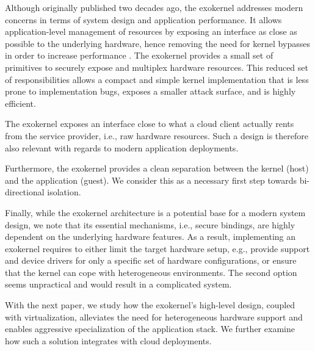 Although originally published two decades ago, the exokernel addresses modern concerns in terms of system design and application performance.
It allows application-level management of resources by exposing an interface as close as possible to the underlying hardware, hence removing the need for kernel bypasses in order to increase performance \cite{BelayPKGKB14,DBLP:journals/tocs/CaoFKL96}.
The exokernel provides a small set of primitives to securely expose and multiplex hardware resources.
This reduced set of responsibilities allows a compact and simple kernel implementation that is less prone to implementation bugs, exposes a smaller attack surface, and is highly efficient.

The exokernel exposes an interface close to what a cloud client actually rents from the service provider, i.e., raw hardware resources.
Such a design is therefore also relevant with regards to modern application deployments. 

Furthermore, the exokernel provides a clean separation between the kernel (host) and the application (guest).
We consider this as a necessary first step towards bi-directional isolation.

Finally, while the exokernel architecture is a potential base for a modern system design, we note that its essential mechanisms, i.e., secure bindings, are highly dependent on the underlying hardware features.
As a result, implementing an exokernel requires to either limit the target hardware setup, e.g., provide support and device drivers for only a specific set of hardware configurations, or ensure that the kernel can cope with heterogeneous environments.
The second option seems unpractical and would result in a complicated system.

With the next paper, we study how the exokernel's high-level design, coupled with virtualization, alleviates the need for heterogeneous hardware support and enables aggressive specialization of the application stack.
We further examine how such a solution integrates with cloud deployments.



